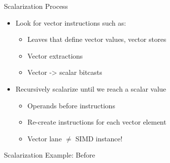 \begin{frame}{Scalarization Process}

\begin{itemize}
    \item Look for vector  instructions such as:
    \begin{itemize}
        \item Leaves that define vector values, vector stores
        \item Vector extractions
        \item Vector -> scalar bitcasts
    \end{itemize}
    
    \item Recursively scalarize until we reach a scalar value
    \begin{itemize}
        \item Operands before instructions
        \item Re-create instructions for each vector element
        \item Vector lane $\neq$ SIMD instance!
    \end{itemize}
    
\end{itemize}

\end{frame}


\begin{frame}[c]{Scalarization Example: Before}


\end{frame}


